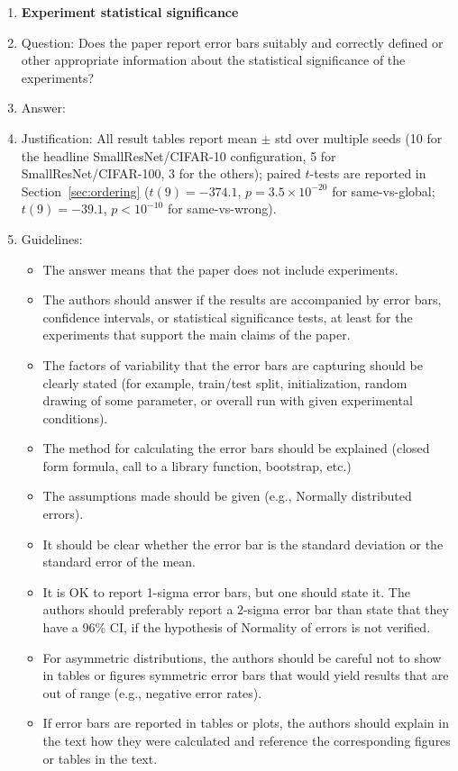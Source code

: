 \documentclass{article}
\begin{document}
\begin{enumerate}
\item {\bf Experiment statistical significance}
    \item[] Question: Does the paper report error bars suitably and correctly defined or other appropriate information about the statistical significance of the experiments?
    \item[] Answer: \answerYes{}
    \item[] Justification: All result tables report mean $\pm$ std over multiple seeds (10 for the headline SmallResNet/CIFAR-10 configuration, 5 for SmallResNet/CIFAR-100, 3 for the others); paired $t$-tests are reported in Section~\ref{sec:ordering} ($t(9)=-374.1$, $p=3.5\times 10^{-20}$ for same-vs-global; $t(9)=-39.1$, $p<10^{-10}$ for same-vs-wrong).
    \item[] Guidelines:
    \begin{itemize}
        \item The answer \answerNA{} means that the paper does not include experiments.
        \item The authors should answer \answerYes{} if the results are accompanied by error bars, confidence intervals, or statistical significance tests, at least for the experiments that support the main claims of the paper.
        \item The factors of variability that the error bars are capturing should be clearly stated (for example, train/test split, initialization, random drawing of some parameter, or overall run with given experimental conditions).
        \item The method for calculating the error bars should be explained (closed form formula, call to a library function, bootstrap, etc.)
        \item The assumptions made should be given (e.g., Normally distributed errors).
        \item It should be clear whether the error bar is the standard deviation or the standard error of the mean.
        \item It is OK to report 1-sigma error bars, but one should state it. The authors should preferably report a 2-sigma error bar than state that they have a 96\% CI, if the hypothesis of Normality of errors is not verified.
        \item For asymmetric distributions, the authors should be careful not to show in tables or figures symmetric error bars that would yield results that are out of range (e.g., negative error rates).
        \item If error bars are reported in tables or plots, the authors should explain in the text how they were calculated and reference the corresponding figures or tables in the text.
    \end{itemize}


\end{enumerate}
\end{document}
